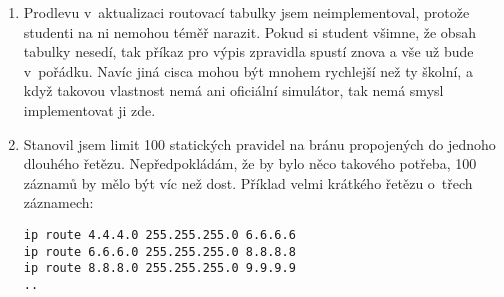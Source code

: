 \begin{enumerate}
 \item Prodlevu v~aktualizaci routovací tabulky jsem neimplementoval, protože studenti na ni nemohou téměř narazit. Pokud si student všimne, že obsah tabulky nesedí, tak příkaz pro výpis zpravidla spustí znova a vše už bude v~pořádku. Navíc jiná cisca mohou být mnohem rychlejší než ty školní, a když takovou vlastnost nemá ani oficiální simulátor, tak nemá smysl implementovat ji zde.

 \item Stanovil jsem limit 100 statických pravidel na bránu propojených do jednoho dlouhého řetězu. Nepředpokládám, že by bylo něco takového potřeba, 100 záznamů by mělo být víc než dost. Příklad velmi krátkého řetězu o~třech záznamech:
\begin{verbatim}
ip route 4.4.4.0 255.255.255.0 6.6.6.6
ip route 6.6.6.0 255.255.255.0 8.8.8.8
ip route 8.8.8.0 255.255.255.0 9.9.9.9
..
\end{verbatim} 


\end{enumerate}


